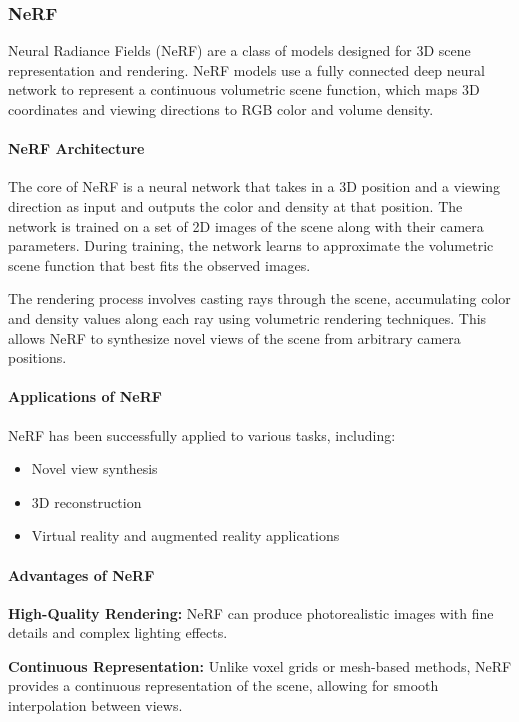 \documentclass[12pt]{article}
\begin{document}
\subsubsection{NeRF}

Neural Radiance Fields (NeRF) are a class of models designed for 3D scene representation and rendering. NeRF models use a fully connected deep neural network to represent a continuous volumetric scene function, which maps 3D coordinates and viewing directions to RGB color and volume density.

\paragraph{NeRF Architecture}

The core of NeRF is a neural network that takes in a 3D position and a viewing direction as input and outputs the color and density at that position. The network is trained on a set of 2D images of the scene along with their camera parameters. During training, the network learns to approximate the volumetric scene function that best fits the observed images.

The rendering process involves casting rays through the scene, accumulating color and density values along each ray using volumetric rendering techniques. This allows NeRF to synthesize novel views of the scene from arbitrary camera positions.

\paragraph{Applications of NeRF}

NeRF has been successfully applied to various tasks, including:
\begin{itemize}
    \item Novel view synthesis
    \item 3D reconstruction
    \item Virtual reality and augmented reality applications
\end{itemize}

\paragraph{Advantages of NeRF}

\textbf{High-Quality Rendering:} NeRF can produce photorealistic images with fine details and complex lighting effects.

\textbf{Continuous Representation:} Unlike voxel grids or mesh-based methods, NeRF provides a continuous representation of the scene, allowing for smooth interpolation between views.
\end{document}

